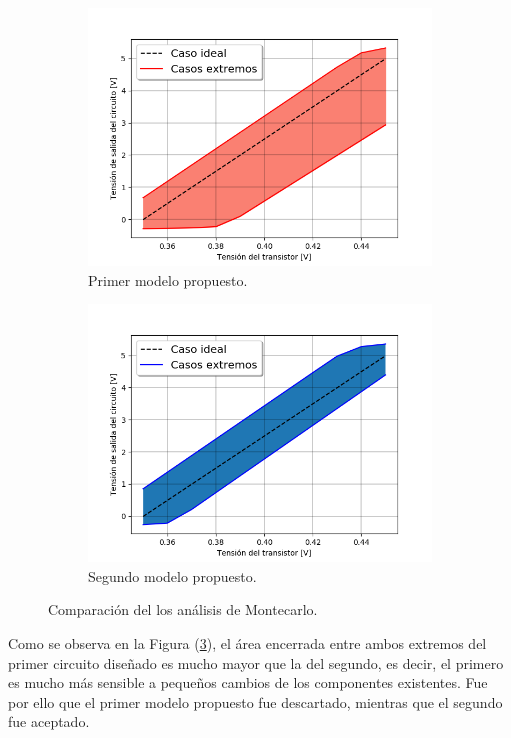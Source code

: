 \documentclass[a4paper]{article}
\begin{document}
\begin{figure}[H]
\centering
\begin{subfigure}{.8\textwidth}
  \centering
  \includegraphics[width=.85\linewidth]{Ejercicio6/Imagenes/MC-1M.png}
  \caption{Primer modelo propuesto.}
  \label{fig:mcm1}
\end{subfigure}
\begin{subfigure}{\textwidth}
  \centering
  \includegraphics[width=.7\linewidth]{Ejercicio6/Imagenes/MC-2M.png}
  \caption{Segundo modelo propuesto.}
  \label{fig:mcm2}
\end{subfigure}
\caption{Comparación del los análisis de Montecarlo.}
\label{fig:mccomp}
\end{figure}

Como se observa en la Figura (\ref{fig:mccomp}), el área encerrada entre ambos extremos del primer circuito diseñado es mucho mayor que la del segundo, es decir, el primero es mucho más sensible a pequeños cambios de los componentes existentes. Fue por ello que el primer modelo propuesto fue descartado, mientras que el segundo fue aceptado. 
\end{document}
